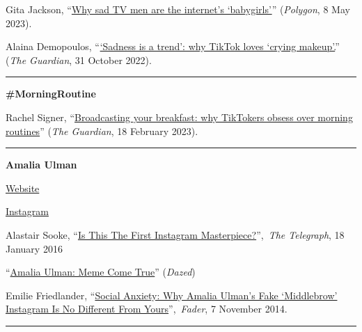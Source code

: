 \documentclass[
  letterpaper,
  DIV=11,
  numbers=noendperiod,
  oneside]{scrartcl}
\begin{document}
Gita Jackson,
``\href{https://www.polygon.com/23711849/succession-babygirl-kendall-roy-jesse-breaking-bad}{Why
sad TV men are the internet's `babygirls'}'' (\emph{Polygon}, 8 May
2023).

Alaina Demopoulos,
``\href{https://www.theguardian.com/lifeandstyle/2022/oct/30/sadness-is-a-trend-why-tiktok-loves-crying-makeup}{`Sadness
is a trend': why TikTok loves `crying makeup'.}'' (\emph{The Guardian},
31 October 2022).

\begin{center}\rule{0.5\linewidth}{0.5pt}\end{center}

\textbf{\#MorningRoutine}

Rachel Signer,
``\href{https://www.theguardian.com/lifeandstyle/2023/feb/19/broadcasting-your-breakfast-why-tiktokers-obsess-over-morning-routines}{Broadcasting
your breakfast: why TikTokers obsess over morning routines}'' (\emph{The
Guardian}, 18 February 2023).

\begin{center}\rule{0.5\linewidth}{0.5pt}\end{center}

\textbf{Amalia Ulman}

\href{http://amaliaulman.eu/}{Website}

\href{https://www.instagram.com/amaliaulman/}{Instagram}

Alastair Sooke,
``\href{http://www.telegraph.co.uk/photography/what-to-see/is-this-the-first-instagram-masterpiece/}{Is
This The First Instagram Masterpiece?}'',~\emph{The Telegraph}, 18
January 2016

``\href{http://www.dazeddigital.com/artsandculture/article/23700/1/amalia-ulman-meme-come-true}{Amalia
Ulman: Meme Come True}'' (\emph{Dazed})

Emilie Friedlander,
``\href{http://www.thefader.com/2014/11/07/social-anxiety-why-amalia-ulmans-middlebrow-instagram-feed-is-no-different-from-yours}{Social
Anxiety: Why Amalia Ulman's Fake `Middlebrow' Instagram Is No Different
From Yours}'',~\emph{Fader}, 7 November 2014.

\begin{center}\rule{0.5\linewidth}{0.5pt}\end{center}
\end{document}
